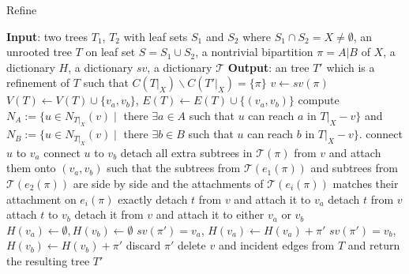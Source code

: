 \documentclass[twocolumn]{bmcart}%
\theoremstyle{mystyle}
\theoremstyle{proofstyle}
\begin{document}
\begin{algorithm}
    \caption{Refine}
    \label{alg:refine}
    \begin{algorithmic}[1]
        \Statex \textbf{Input}: two trees $T_1$, $T_2$ with leaf sets $S_1$ and $S_2$ where $S_1 \cap S_2 = X \neq \emptyset$, an unrooted tree $T$ on leaf set $S = S_1 \cup S_2$, a nontrivial bipartition $\pi = A|B$ of $X$, a dictionary $H$, a dictionary $sv$, a dictionary $\mathcal{T}$
        \Statex \textbf{Output}: an tree $T'$ which is a refinement of $T$ such that $C(T|_X) \backslash C(T'|_X) = \{\pi\}$ 
        \State $v \gets sv(\pi)$
        \State $V(T) \gets V(T) \cup \{v_a, v_b\}$, $E(T) \gets E(T) \cup \{(v_a,v_b)\}$
        \State compute $N_A:= \{u \in N_{T|_X}(v) \mid $ there $\exists a \in A$ such that $u$ can reach $a$ in $T|_X-v \}$ and $N_B:= \{u \in N_{T|_X}(v) \mid$ there $\exists b \in B$ such that $u$ can reach $b$ in $T|_X-v\}$. 
             connect $u$ to $v_a$
            \Else{} connect $u$ to $v_b$
            \EndIf
        \EndFor
        \State detach all extra subtrees in $\mathcal{T}(\pi)$ from $v$ and attach them onto $(v_a,v_b)$ such that the subtrees from $\mathcal{T}(e_1(\pi))$ and subtrees from $\mathcal{T}(e_2(\pi))$ are side by side and the attachments of $\mathcal{T}(e_i(\pi))$ matches their attachment on $e_i(\pi)$ exactly
            \State detach $t$ from $v$ and attach it to $v_a$
        \EndFor
            \State detach $t$ from $v$ attach $t$ to $v_b$
        \EndFor
            \State detach it from $v$ and attach it to either $v_a$ or $v_b$
        \EndFor
        \State $H(v_a) \gets \emptyset, H(v_b) \gets \emptyset$
                \State $sv(\pi') = v_a$, $H(v_a) \gets H(v_a) + \pi'$
                \State $sv(\pi') = v_b$, $H(v_b) \gets H(v_b) + \pi'$
            \Else{} 
                \State discard $\pi'$
            \EndIf
        \EndFor
        \State delete $v$ and incident edges from $T$ and return the resulting tree $T'$
    \end{algorithmic}
\end{algorithm}
 
\end{document}
